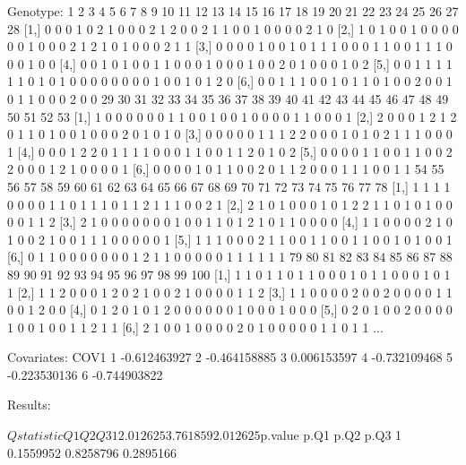 \documentclass{article}
\begin{document}
\begin{Schunk}
\begin{Soutput}
Genotype:
     1 2 3 4 5 6 7 8 9 10 11 12 13 14 15 16 17 18 19 20 21 22 23 24 25 26 27 28
[1,] 0 0 0 1 0 2 1 0 0  0  2  1  2  0  0  2  1  1  0  0  1  0  0  0  0  2  1  0
[2,] 1 0 1 0 0 1 0 0 0  0  0  0  1  0  0  0  2  1  2  1  0  1  0  0  0  2  1  1
[3,] 0 0 0 0 1 0 0 1 0  1  1  1  0  0  0  1  1  0  0  1  1  1  0  0  0  1  0  0
[4,] 0 0 1 0 1 0 0 1 1  0  0  0  1  0  0  0  1  0  0  2  0  1  0  0  0  1  0  2
[5,] 0 0 1 1 1 1 1 1 0  1  0  1  0  0  0  0  0  0  0  0  1  0  0  1  0  1  2  0
[6,] 0 0 1 1 1 0 0 1 0  1  1  0  1  0  0  2  0  0  1  0  1  1  0  0  0  2  0  0
     29 30 31 32 33 34 35 36 37 38 39 40 41 42 43 44 45 46 47 48 49 50 51 52 53
[1,]  1  0  0  0  0  0  0  1  1  0  0  1  0  0  1  0  0  0  0  1  1  0  0  0  1
[2,]  2  0  0  0  1  2  1  2  0  1  1  0  1  0  0  1  0  0  0  2  0  1  0  1  0
[3,]  0  0  0  0  0  1  1  1  2  2  0  0  0  1  0  1  0  2  1  1  1  0  0  0  1
[4,]  0  0  0  1  2  2  0  1  1  1  1  0  0  0  1  1  0  0  1  1  2  0  1  0  2
[5,]  0  0  0  0  1  1  0  0  1  1  0  0  2  2  0  0  0  1  2  1  0  0  0  0  1
[6,]  0  0  0  0  1  0  1  1  0  0  2  0  1  1  2  0  0  0  1  1  1  0  0  1  1
     54 55 56 57 58 59 60 61 62 63 64 65 66 67 68 69 70 71 72 73 74 75 76 77 78
[1,]  1  1  1  1  0  0  0  0  1  1  0  1  1  1  0  1  1  2  1  1  1  0  0  2  1
[2,]  2  1  0  1  0  0  0  1  0  1  2  2  1  1  0  1  0  1  0  0  0  0  1  1  2
[3,]  2  1  0  0  0  0  0  0  0  1  0  0  1  1  0  1  2  1  0  1  1  0  0  0  0
[4,]  1  1  0  0  0  0  2  1  0  1  0  0  2  1  0  0  1  1  1  0  0  0  0  0  1
[5,]  1  1  1  0  0  0  2  1  1  0  0  1  1  0  0  1  1  0  0  1  0  1  0  0  1
[6,]  0  1  1  0  0  0  0  0  0  0  1  2  1  1  0  0  0  0  0  1  1  1  1  1  1
     79 80 81 82 83 84 85 86 87 88 89 90 91 92 93 94 95 96 97 98 99 100
[1,]  1  1  0  1  1  0  1  1  0  0  0  1  0  1  1  0  0  0  1  0  1   1
[2,]  1  1  2  0  0  0  1  2  0  2  1  0  0  2  1  0  0  0  0  1  1   2
[3,]  1  1  0  0  0  0  2  0  0  2  0  0  0  0  1  1  0  0  1  2  0   0
[4,]  0  1  2  0  1  0  1  2  0  0  0  0  0  0  1  0  0  0  1  0  0   0
[5,]  0  2  0  1  0  0  2  0  0  0  0  1  0  0  1  0  0  1  1  2  1   1
[6,]  2  1  0  0  1  0  0  0  0  2  0  1  0  0  0  0  0  1  1  0  1   1
...

Covariates:
          COV1
1 -0.612463927
2 -0.464158885
3  0.006153597
4 -0.732109468
5 -0.223530136
6 -0.744903822


Results:

$Qstatistic
        Q1       Q2       Q3
1 2.012625 3.761859 2.012625

$p.value
       p.Q1      p.Q2      p.Q3
1 0.1559952 0.8258796 0.2895166
\end{Soutput}
\end{Schunk}
\end{document}
